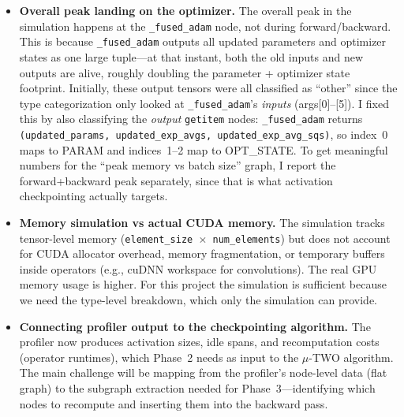 \documentclass[11pt]{article}
\begin{document}
\begin{itemize}
  \item \textbf{Overall peak landing on the optimizer.} The overall peak in the simulation happens at the \texttt{\_fused\_adam} node, not during forward/backward. This is because \texttt{\_fused\_adam} outputs all updated parameters and optimizer states as one large tuple---at that instant, both the old inputs and new outputs are alive, roughly doubling the parameter + optimizer state footprint. Initially, these output tensors were all classified as ``other'' since the type categorization only looked at \texttt{\_fused\_adam}'s \emph{inputs} (args[0]--[5]). I fixed this by also classifying the \emph{output} \texttt{getitem} nodes: \texttt{\_fused\_adam} returns \texttt{(updated\_params, updated\_exp\_avgs, updated\_exp\_avg\_sqs)}, so index~0 maps to PARAM and indices~1--2 map to OPT\_STATE. To get meaningful numbers for the ``peak memory vs batch size'' graph, I report the forward+backward peak separately, since that is what activation checkpointing actually targets.

  \item \textbf{Memory simulation vs actual CUDA memory.} The simulation tracks tensor-level memory (\texttt{element\_size $\times$ num\_elements}) but does not account for CUDA allocator overhead, memory fragmentation, or temporary buffers inside operators (e.g., cuDNN workspace for convolutions). The real GPU memory usage is higher. For this project the simulation is sufficient because we need the type-level breakdown, which only the simulation can provide.

  \item \textbf{Connecting profiler output to the checkpointing algorithm.} The profiler now produces activation sizes, idle spans, and recomputation costs (operator runtimes), which Phase~2 needs as input to the $\mu$-TWO algorithm. The main challenge will be mapping from the profiler's node-level data (flat graph) to the subgraph extraction needed for Phase~3---identifying which nodes to recompute and inserting them into the backward pass.
\end{itemize}
\end{document}
